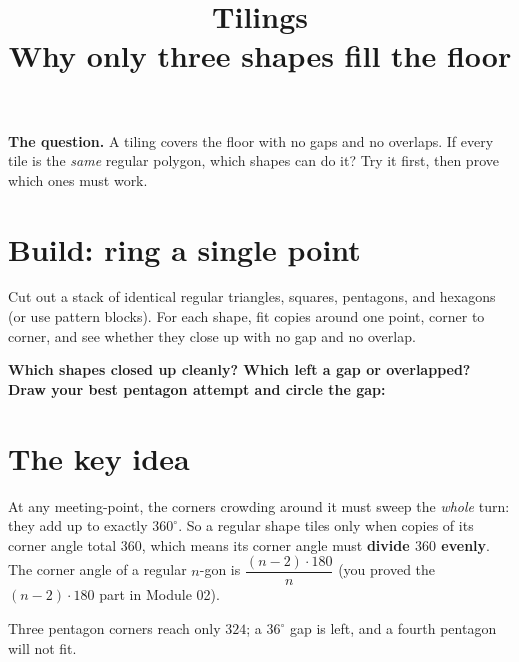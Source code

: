 \documentclass[11pt]{article}
\title{\vspace{-1.5cm}\textbf{Tilings}\\[-2pt]
  \large Why only three shapes fill the floor}
\author{}
\date{}
\newcommand{\drawbox}[1]{%
  \par\vspace{4pt}\noindent
  \fbox{\rule{0pt}{#1}\rule{\dimexpr\linewidth-2\fboxsep-2\fboxrule}{0pt}}%
  \par\vspace{6pt}}
\newcommand{\task}[1]{\par\medskip\noindent\textbf{\color{benblue}#1}\par\nopagebreak}
\begin{document}
\maketitle
\vspace{-1.2cm}

\noindent\textbf{The question.} A tiling covers the floor with no gaps and no
overlaps. If every tile is the \emph{same} regular polygon, which shapes can do
it? Try it first, then prove which ones must work.

\section*{Build: ring a single point}
Cut out a stack of identical regular triangles, squares, pentagons, and hexagons
(or use pattern blocks). For each shape, fit copies around one point, corner to
corner, and see whether they close up with no gap and no overlap.
\task{Which shapes closed up cleanly? Which left a gap or overlapped? Draw your
best pentagon attempt and circle the gap:}
\drawbox{4.5cm}

\section*{The key idea}
At any meeting-point, the corners crowding around it must sweep the \emph{whole}
turn: they add up to exactly $360^\circ$. So a regular shape tiles only when
copies of its corner angle total $360$, which means its corner angle must
\textbf{divide $360$ evenly}. The corner angle of a regular $n$-gon is
$\dfrac{(n-2)\cdot 180}{n}$ (you proved the $(n-2)\cdot 180$ part in Module 02).

\begin{center}
\end{center}
\begin{center}\small Three pentagon corners reach only $324$; a $36^\circ$ gap is
left, and a fourth pentagon will not fit.\end{center}
\end{document}
